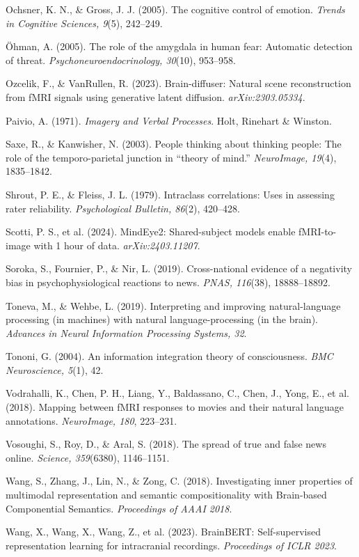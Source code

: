 \documentclass[11pt,letterpaper]{article}
\numberwithin{equation}{section}
\begin{document}
Ochsner, K. N., \& Gross, J. J. (2005). The cognitive control of emotion. \textit{Trends in Cognitive Sciences, 9}(5), 242--249.

\"{O}hman, A. (2005). The role of the amygdala in human fear: Automatic detection of threat. \textit{Psychoneuroendocrinology, 30}(10), 953--958.

Ozcelik, F., \& VanRullen, R. (2023). Brain-diffuser: Natural scene reconstruction from fMRI signals using generative latent diffusion. \textit{arXiv:2303.05334}.

Paivio, A. (1971). \textit{Imagery and Verbal Processes}. Holt, Rinehart \& Winston.

Saxe, R., \& Kanwisher, N. (2003). People thinking about thinking people: The role of the temporo-parietal junction in ``theory of mind.'' \textit{NeuroImage, 19}(4), 1835--1842.

Shrout, P. E., \& Fleiss, J. L. (1979). Intraclass correlations: Uses in assessing rater reliability. \textit{Psychological Bulletin, 86}(2), 420--428.

Scotti, P. S., et al. (2024). MindEye2: Shared-subject models enable fMRI-to-image with 1 hour of data. \textit{arXiv:2403.11207}.

Soroka, S., Fournier, P., \& Nir, L. (2019). Cross-national evidence of a negativity bias in psychophysiological reactions to news. \textit{PNAS, 116}(38), 18888--18892.

Toneva, M., \& Wehbe, L. (2019). Interpreting and improving natural-language processing (in machines) with natural language-processing (in the brain). \textit{Advances in Neural Information Processing Systems, 32}.

Tononi, G. (2004). An information integration theory of consciousness. \textit{BMC Neuroscience, 5}(1), 42.

Vodrahalli, K., Chen, P. H., Liang, Y., Baldassano, C., Chen, J., Yong, E., et al. (2018). Mapping between fMRI responses to movies and their natural language annotations. \textit{NeuroImage, 180}, 223--231.

Vosoughi, S., Roy, D., \& Aral, S. (2018). The spread of true and false news online. \textit{Science, 359}(6380), 1146--1151.

Wang, S., Zhang, J., Lin, N., \& Zong, C. (2018). Investigating inner properties of multimodal representation and semantic compositionality with Brain-based Componential Semantics. \textit{Proceedings of AAAI 2018}.

Wang, X., Wang, X., Wang, Z., et al. (2023). BrainBERT: Self-supervised representation learning for intracranial recordings. \textit{Proceedings of ICLR 2023}.
\end{document}
